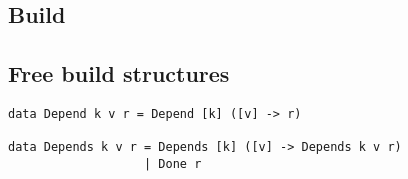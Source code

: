 \subsection{Build}\label{sec-general-build}


\subsection{Free build structures}\label{sec-free-build}

\begin{verbatim}
data Depend k v r = Depend [k] ([v] -> r)

data Depends k v r = Depends [k] ([v] -> Depends k v r)
                   | Done r
\end{verbatim}
